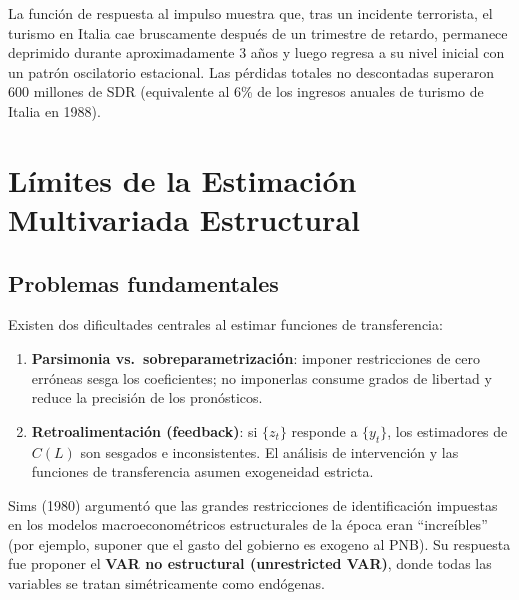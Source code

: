\documentclass[12pt]{article}
\begin{document}
\begin{intuicion}
La funci\'on de respuesta al impulso muestra que, tras un incidente terrorista, el turismo en Italia cae bruscamente despu\'es de un trimestre de retardo, permanece deprimido durante aproximadamente 3 a\~nos y luego regresa a su nivel inicial con un patr\'on oscilatorio estacional. Las p\'erdidas totales no descontadas superaron 600 millones de SDR (equivalente al 6\% de los ingresos anuales de turismo de Italia en 1988).
\end{intuicion}

\section{L\'imites de la Estimaci\'on Multivariada Estructural}

\subsection{Problemas fundamentales}

Existen dos dificultades centrales al estimar funciones de transferencia:

\begin{enumerate}
  \item \textbf{Parsimonia vs.\ sobreparametrizaci\'on}: imponer restricciones de cero err\'oneas sesga los coeficientes; no imponerlas consume grados de libertad y reduce la precisi\'on de los pron\'osticos.
  \item \textbf{Retroalimentaci\'on (feedback)}: si $\{z_t\}$ responde a $\{y_t\}$, los estimadores de $C(L)$ son sesgados e inconsistentes. El an\'alisis de intervenci\'on y las funciones de transferencia asumen exogeneidad estricta.
\end{enumerate}

\begin{intuicion}
Sims (1980) argument\'o que las grandes restricciones de identificaci\'on impuestas en los modelos macroeconom\'etricos estructurales de la \'epoca eran ``incre\'ibles'' (por ejemplo, suponer que el gasto del gobierno es exogeno al PNB). Su respuesta fue proponer el \textbf{VAR no estructural (unrestricted VAR)}, donde todas las variables se tratan sim\'etricamente como end\'ogenas.
\end{intuicion}

\end{document}

